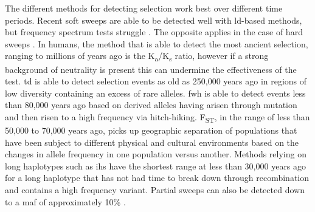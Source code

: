 \documentclass[twoside,openright]{report}
\begin{document}
The different methods for detecting selection work best over different
time periods. Recent soft sweeps are able to be detected well with
\gls{ld}-based methods, but frequency spectrum tests struggle
\citep{Hermisson2005}. The opposite applies in the case of hard sweeps
\citep{Hermisson2005}. In humans, the method that is able to detect the
most ancient selection, ranging to millions of years ago is the
K\textsubscript{a}/K\textsubscript{s} ratio, however if a strong
background of neutrality is present this can undermine the effectiveness
of the test. \Gls{td} is able to detect selection events as old as
250,000 years ago in regions of low diversity containing an excess of
rare alleles. \Gls{fwh} is able to detect events less than 80,000 years
ago based on derived alleles having arisen through mutation and then
risen to a high frequency via hitch-hiking. F\textsubscript{ST}, in the
range of less than 50,000 to 70,000 years ago, picks up geographic
separation of populations that have been subject to different physical
and cultural environments based on the changes in allele frequency in
one population versus another. Methods relying on long haplotypes such
as \gls{ihs} have the shortest range at less than 30,000 years ago for a
long haplotype that has not had time to break down through recombination
and contains a high frequency variant. Partial sweeps can also be
detected down to a \gls{maf} of approximately 10\%
\citep{sabeti2006positive}.
\end{document}
